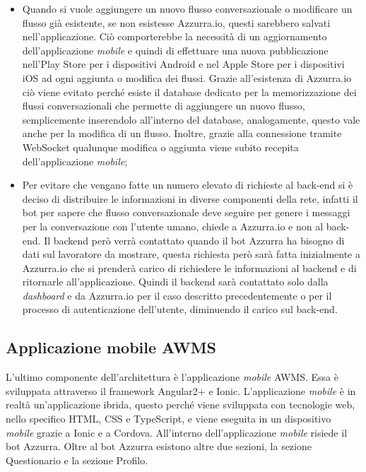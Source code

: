\begin{trivlist}
	\begin{itemize}
		\item Quando si vuole aggiungere un nuovo flusso conversazionale o modificare un flusso già esistente, se non esistesse Azzurra.io, questi sarebbero salvati nell'applicazione. Ciò comporterebbe la necessità di un aggiornamento dell'applicazione \emph{mobile} e quindi di effettuare una nuova pubblicazione nell'Play Store per i dispositivi \gls{Android}\ap{[g]} e nel Apple Store per i dispositivi \gls{iOS}\ap{[g]} ad ogni aggiunta o modifica dei flussi. Grazie all'esistenza di Azzurra.io ciò viene evitato perché esiste il database dedicato per la memorizzazione dei flussi conversazionali che permette di aggiungere un nuovo flusso, semplicemente inserendolo all'interno del database, analogamente, questo vale anche per la modifica di un flusso. Inoltre, grazie alla connessione tramite \gls{WebSocket}\ap{[g]} qualunque modifica o aggiunta viene subito recepita dell'applicazione \emph{mobile};
		\item Per evitare che vengano fatte un numero elevato di richieste al back-end si è deciso di distribuire le informazioni in diverse componenti della rete, infatti il \gls{bot}\ap{[g]} per sapere che flusso conversazionale deve seguire per genere i messaggi per la conversazione con l'utente umano, chiede a Azzurra.io e non al back-end. Il backend però verrà contattato quando il \gls{bot}\ap{[g]} Azzurra ha bisogno di dati sul lavoratore da mostrare, questa richiesta però sarà fatta inizialmente a Azzurra.io che si prenderà carico di richiedere le informazioni al backend e di ritornarle all'applicazione. Quindi il backend sarà contattato solo dalla \emph{dashboard} e da Azzurra.io per il caso descritto precedentemente o per il processo di autenticazione dell'utente, diminuendo il carico sul back-end.
	\end{itemize}
	
	\item\subsection{Applicazione mobile AWMS}
	L'ultimo componente dell'\gls{architettura}\ap{[g]} è l'applicazione \emph{mobile} \gls{AWMS}. Essa è sviluppata attraverso il \gls{framework}\ap{[g]} Angular2+ e Ionic. L'applicazione \emph{mobile} è in realtà un'\gls{applicazione ibrida}\ap{[g]}, questo perché viene sviluppata con tecnologie web, nello specifico \gls{HTML}, \gls{CSS} e TypeScript, e viene eseguita in un dispositivo \emph{mobile} grazie a Ionic e a Cordova. All'interno dell'applicazione \emph{mobile} risiede il \gls{bot}\ap{[g]} Azzurra. Oltre al \gls{bot}\ap{[g]} Azzurra esistono altre due sezioni, la sezione Questionario e la sezione Profilo. 
	

\end{trivlist}
